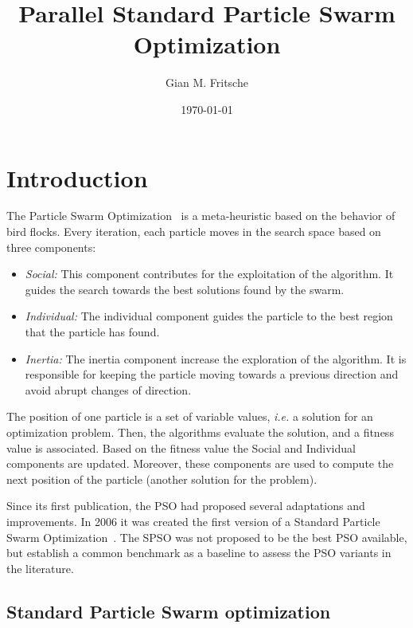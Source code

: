 \documentclass{article}
\title{Parallel Standard Particle Swarm Optimization}
\author{Gian M. Fritsche}
\date{\today}
\begin{document}
    \maketitle

    \section{Introduction}

    The Particle Swarm Optimization~\cite{PSO95} is a meta-heuristic based on the behavior of bird flocks. Every iteration, each particle moves in the search space based on three components:

    \begin{itemize}
        \item {\em Social:} This component contributes for the exploitation of the algorithm.
        It guides the search towards the best solutions found by the swarm.
        \item {\em Individual:} The individual component guides the particle to the best region that the particle has found.
        \item {\em Inertia:} The inertia component increase the exploration of the algorithm. It is responsible for keeping the particle moving towards a previous direction and avoid abrupt changes of direction.
    \end{itemize}

    The position of one particle is a set of variable values, {\em i.e.} a solution for an optimization problem. Then, the algorithms evaluate the solution, and a fitness value is associated. Based on the fitness value the Social and Individual components are updated.
    Moreover, these components are used to compute the next position of the particle (another solution for the problem).

    Since its first publication, the PSO had proposed several adaptations and improvements.
    In 2006 it was created the first version of a Standard Particle Swarm Optimization~\cite{SPSO}. The SPSO was not proposed to be the best PSO available, but establish a common benchmark as a baseline to assess the PSO variants in the literature.

    \subsection {Standard Particle Swarm optimization}
\end{document}
